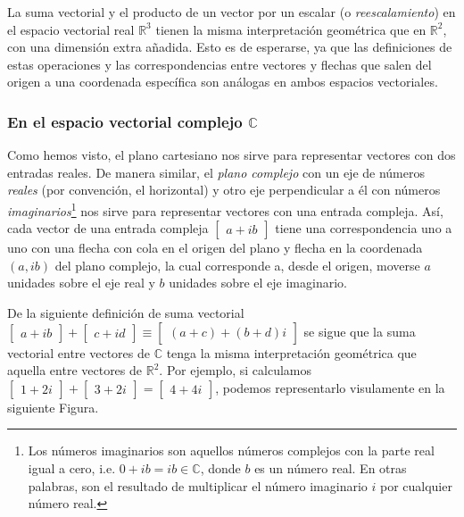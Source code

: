 \documentclass[12pt]{article}
\begin{document}
La suma vectorial y el producto de un vector por un escalar (o \emph{reescalamiento}) en el espacio vectorial real $\mathbb{R}^3$ tienen la misma interpretación geométrica que en $\mathbb{R}^2$, con una dimensión extra añadida. Esto es de esperarse, ya que las definiciones de estas operaciones y las correspondencias entre vectores y flechas que salen del origen a una coordenada específica son análogas en ambos espacios vectoriales.

\subsubsection{En el espacio vectorial complejo $\mathbb{C}$}

Como hemos visto, el plano cartesiano nos sirve para representar vectores con dos entradas reales. De manera similar, el \emph{plano complejo} \textemdash con un eje de números \emph{reales} (por convención, el horizontal) y otro eje perpendicular a él con números \emph{imaginarios}\footnote{Los números imaginarios son aquellos números complejos con la parte real igual a cero, i.e. $0+ib=ib\in\mathbb{C}$, donde $b$ es un número real. En otras palabras, son el resultado de multiplicar el número imaginario $i$ por cualquier número real.}\textemdash\hspace{0.5mm} nos sirve para representar vectores con una entrada compleja. Así, cada vector de una entrada compleja $\begin{bmatrix}a+ib\end{bmatrix}$ tiene una correspondencia uno a uno con una flecha con cola en el origen del plano y flecha en la coordenada $(a,ib)$ del plano complejo, la cual corresponde a, desde el origen, moverse $a$ unidades sobre el eje real y $b$ unidades sobre el eje imaginario.

De la siguiente definición de suma vectorial $\begin{bmatrix}a+ib\end{bmatrix}+\begin{bmatrix}c+id\end{bmatrix}\equiv\begin{bmatrix}(a+c)+(b+d)i\end{bmatrix}$ se sigue que la suma vectorial entre vectores de $\mathbb{C}$ tenga la misma interpretación geométrica que aquella entre vectores de $\mathbb{R}^2$. Por ejemplo, si calculamos $\begin{bmatrix}1+2i\end{bmatrix}+\begin{bmatrix}3+2i\end{bmatrix}=\begin{bmatrix}4+4i\end{bmatrix}$, podemos representarlo visulamente en la siguiente Figura.
\end{document}
